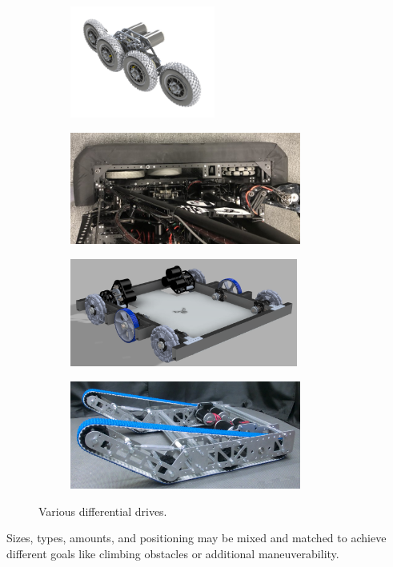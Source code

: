 \begin{figure}[H]
\begin{subfigure}[b]{.3\linewidth}
	\includegraphics[height=1.45in]{imgs/drivetrain_pneumatic.png}
\end{subfigure}\begin{subfigure}[b]{.6\linewidth}
	\includegraphics[height=1.45in]{imgs/drivetrain_148_2018.jpeg}
\end{subfigure}

\begin{subfigure}[b]{.45\linewidth}
	\includegraphics[height=1.4in]{imgs/drivetrain_corneromni.png}
\end{subfigure}\begin{subfigure}[b]{.45\linewidth}
	\includegraphics[height=1.4in]{imgs/drivetrain_tank.png}
\end{subfigure}
\caption{Various differential drives.}
\end{figure}

Sizes, types, amounts, and positioning may be mixed and matched to achieve different goals like climbing obstacles or additional maneuverability.

